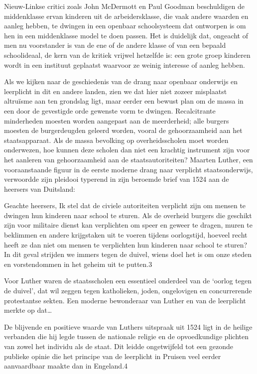 \documentclass[
  a5paper,
  smalldemyvopaper,10pt,twoside,onecolumn,openright,extrafontsizes,hidelinks]{memoir}
\renewenvironment{quote}%
               {\list{}{\rightmargin=.6cm\leftmargin=.6cm}%
                \itshape \item[]}%
               {\endlist}
\begin{document}
Nieuw-Linkse critici zoals John McDermott en Paul Goodman beschuldigen
de middenklasse ervan kinderen uit de arbeidersklasse, die vaak andere
waarden en aanleg hebben, te dwingen in een openbaar schoolsysteem dat
ontworpen is om hen in een middenklasse model te doen passen. Het is
duidelijk dat, ongeacht of men nu voorstander is van de ene of de andere
klasse of van een bepaald schoolideaal, de kern van de kritiek vrijwel
hetzelfde is: een grote groep kinderen wordt in een instituut geplaatst
waarvoor ze weinig interesse of aanleg hebben.

Als we kijken naar de geschiedenis van de drang naar openbaar onderwijs
en leerplicht in dit en andere landen, zien we dat hier niet zozeer
misplaatst altruïsme aan ten grondslag ligt, maar eerder een bewust plan
om de massa in een door de gevestigde orde gewenste vorm te dwingen.
Recalcitrante minderheden moesten worden aangepast aan de meerderheid;
alle burgers moesten de burgerdeugden geleerd worden, vooral de
gehoorzaamheid aan het staatsapparaat. Als de massa bevolking op
overheidsscholen moet worden onderwezen, hoe kunnen deze scholen dan
niet een krachtig instrument zijn voor het aanleren van gehoorzaamheid
aan de staatsautoriteiten? Maarten Luther, een vooraanstaande figuur in
de eerste moderne drang naar verplicht staatsonderwijs, verwoordde zijn
pleidooi typerend in zijn beroemde brief van 1524 aan de heersers van
Duitsland:

\begin{quote}
Geachte heersers, Ik stel dat de civiele autoriteiten verplicht zijn om
mensen te dwingen hun kinderen naar school te sturen. Als de overheid
burgers die geschikt zijn voor militaire dienst kan verplichten om speer
en geweer te dragen, muren te beklimmen en andere krijgstaken uit te
voeren tijdens oorlogstijd, hoeveel recht heeft ze dan niet om mensen te
verplichten hun kinderen naar school te sturen? In dit geval strijden we
immers tegen de duivel, wiens doel het is om onze steden en
vorstendommen in het geheim uit te putten.3
\end{quote}

Voor Luther waren de staatsscholen een essentieel onderdeel van de
`oorlog tegen de duivel', dat wil zeggen tegen katholieken, joden,
ongelovigen en concurrerende protestantse sekten. Een moderne
bewonderaar van Luther en van de leerplicht merkte op dat\ldots{}

\begin{quote}
De blijvende en positieve waarde van Luthers uitspraak uit 1524 ligt in
de heilige verbanden die hij legde tussen de nationale religie en de
opvoedkundige plichten van zowel het individu als de staat. Dit leidde
ongetwijfeld tot een gezonde publieke opinie die het principe van de
leerplicht in Pruisen veel eerder aanvaardbaar maakte dan in Engeland.4
\end{quote}
\end{document}
